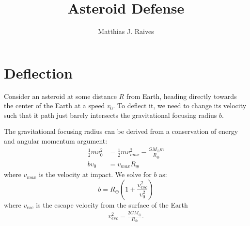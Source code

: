 \documentclass{article}
\title{Asteroid Defense}
\author{Matthias J. Raives}
\begin{document}
	
        \maketitle{}
        
	\section{Deflection}	
	Consider an asteroid at some distance $R$ from Earth, heading directly towards the center of the Earth at a speed $v_{0}$.  To deflect it, we need to change its velocity such that it path just barely intersects the gravitational focusing radius $b$.
	
	The gravitational focusing radius can be derived from a conservation of energy and angular momentum argument:
        \begin{align}
                \frac{1}{2}mv_{0}^{2} &= \frac{1}{2}mv_{max}^{2} - \frac{GM_{\oplus}m}{R_{\oplus}}\\
                bv_{0} &= v_{max}R_{\oplus}
        \end{align}
        where $v_{max}$ is the velocity at impact.  We solve for $b$ as:
        \begin{equation}
                b = R_{\oplus}\left(1+\frac{v_{esc}^{2}}{v_{0}^{2}}\right)
        \end{equation}
        where $v_{esc}$ is the escape velocity from the surface of the Earth
        \begin{align}
                v_{esc}^{2} = \frac{2GM_{\oplus}}{R_{\oplus}}.
        \end{align}
        
\end{document}
